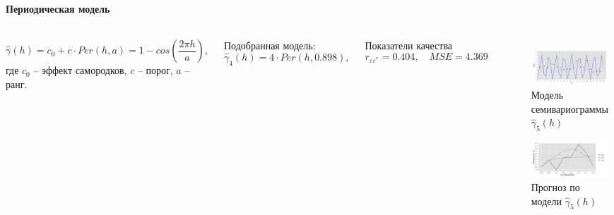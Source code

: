 \documentclass[notheorems]{beamer}
\theoremstyle{definition}
\theoremstyle{example}
\theoremstyle{plain}
\begin{document}
\begin{frame}
  \frametitle{\large\subsecname}
  \framesubtitle{Периодическая модель}
  \begin{columns}[c]
  \column{3in}
  \begin{equation}
  \label{eq:per}
    \widehat{\gamma}(h) = c_0 + c \cdot Per(h, a) = 1 - cos(\frac{2 \pi h}{a}),
  \end{equation}
  где $ c_0 $ -- эффект самородков, $ c $ -- порог, $ a $ -- ранг.

  \vspace{0.5em}

  Подобранная модель:
  \begin{equation}
  \label{eq:gamma6}
    \widehat{\gamma}_4(h) = 4 \cdot Per(h, 0.898),
  \end{equation}

  Показатели качества
  \begin{equation*}
    r_{\varepsilon\varepsilon^{*}} = 0.404, \quad MSE = 4.369
  \end{equation*}

  \column{3in}
  \vspace{-14.5pt}
  \begin{figure}[H]
    \includegraphics[width=0.9\linewidth]{../../figures/variogram/per-fit-cv-modeled.png} \\
    \caption{Модель семивариограммы $\widehat{\gamma}_5(h)$}
    \includegraphics[width=0.9\linewidth]{../../figures/variogram/per-fit-cv-cross-prediction.png}
    \caption{Прогноз по модели $\widehat{\gamma}_5(h)$}
  \end{figure}
  \end{columns}
\end{frame}
\end{document}
